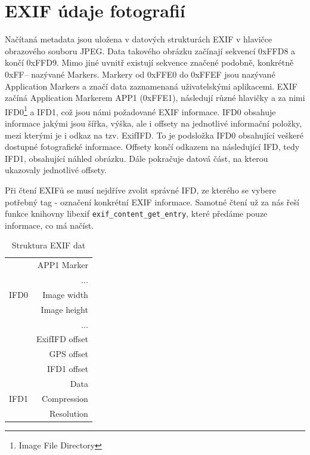 \documentclass[11pt,twoside,a4paper]{book}
\begin{document}
\section{EXIF údaje fotografií}
\noindent
Načítaná metadata jsou uložena v datových strukturách EXIF v hlavičce obrazového souboru JPEG. Data takového obrázku začínají sekvencí 0xFFD8 a končí 0xFFD9. Mimo jiné uvnitř existují sekvence značené podobně, konkrétně 0xFF-- nazývané Markers. Markery od 0xFFE0 do 0xFFEF jsou nazývané Application Markers a značí data zaznamenaná uživatelskými aplikacemi. EXIF začíná Application Markerem APP1 (0xFFE1), následují různé hlavičky a za nimi IFD0\footnote{Image File Directory} a IFD1, což jsou námi požadované EXIF informace. IFD0 obsahuje informace jakými jsou šířka, výška, ale i offsety na jednotlivé informační položky, mezi kterými je i odkaz na tzv. ExifIFD. To je podsložka IFD0 obsahující veškeré dostupné fotografické informace. Offsety končí odkazem na následující IFD, tedy IFD1, obsahující náhled obrázku. Dále pokračuje datová část, na kterou ukazovaly jednotlivé offsety.

\indent
Při čtení EXIFů se musí nejdříve zvolit správné IFD, ze kterého se vybere potřebný tag - označení konkrétní EXIF informace. Samotné čtení už za nás řeší funkce knihovny libexif \verb|exif_content_get_entry|, které předáme pouze informace, co má načíst.

\begin{table}
\begin{center}
\begin{tabular}{|l|r|}
\hline
& APP1 Marker\\
& ... \\
\hline
IFD0 & Image width \\
& Image height \\ 
& ... \\
& ExifIFD offset \\
& GPS offset \\ 
& IFD1 offset \\
& Data \\
\hline
IFD1 & Compression \\
& Resolution \\
\hline
\end{tabular}
\end{center}
\caption{Struktura EXIF dat}
\label{tab:tabexif}
\end{table}
\end{document}
